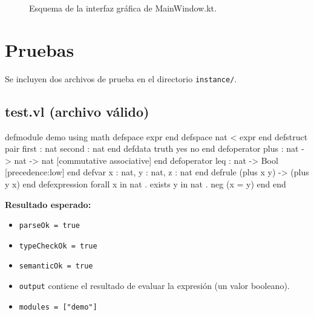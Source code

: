 \documentclass[12pt]{article}
\newcommand{\code}[1]{\texttt{#1}}
\newcommand{\file}[1]{\texttt{#1}}
\begin{document}
\begin{figure}[h!]
\centering
{}
\caption{Esquema de la interfaz gráfica de MainWindow.kt.}
\label{fig:gui}
\end{figure}

\section{Pruebas}

Se incluyen dos archivos de prueba en el directorio \file{instance/}.

\subsection{test.vl (archivo válido)}

\begin{rascal}
defmodule demo
using math
defspace expr end
defspace nat < expr end
defstruct pair
  first : nat
  second : nat
end
defdata truth
  yes
  no
end
defoperator plus : nat -> nat -> nat [commutative associative] end
defoperator leq : nat -> Bool [precedence:low] end
defvar x : nat, y : nat, z : nat end
defrule (plus x y) -> (plus y x) end
defexpression forall x in nat . exists y in nat . neg (x = y) end
end
\end{rascal}

\textbf{Resultado esperado:}
\begin{itemize}
  \item \code{parseOk = true}
  \item \code{typeCheckOk = true}
  \item \code{semanticOk = true}
  \item \code{output} contiene el resultado de evaluar la expresión
        (un valor booleano).
  \item \code{modules = ["demo"]}
\end{itemize}
\end{document}
